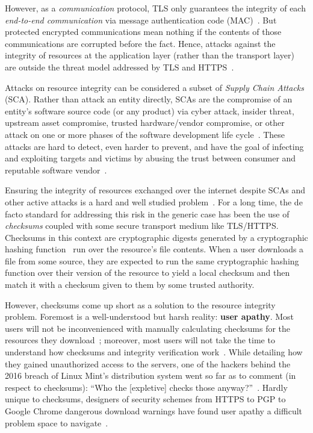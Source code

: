 However, as a \textit{communication} protocol, TLS only guarantees the integrity
of each \textit{end-to-end communication} via message authentication code
(MAC)~\cite{TLS1.2}. But protected encrypted communications mean nothing if the
contents of those communications are corrupted before the fact. Hence, attacks
against the integrity of resources at the application layer (rather than the
transport layer) are outside the threat model addressed by TLS and
HTTPS~\cite{TLS1.2, HTTPS}.

Attacks on resource integrity can be considered a subset of \emph{Supply Chain
Attacks} (SCA). Rather than attack an entity directly, SCAs are the compromise
of an entity's software source code (or any product) via cyber attack, insider
threat, upstream asset compromise, trusted hardware/vendor compromise, or other
attack on one or more phases of the software development life
cycle~\cite{NIST-SCA}. These attacks are hard to detect, even harder to prevent,
and have the goal of infecting and exploiting targets and victims by abusing the
trust between consumer and reputable software vendor~\cite{SCA}.

Ensuring the integrity of resources exchanged over the internet despite SCAs and
other active attacks is a hard and well studied problem~\cite{MD5Header,
HTTP1.1, HTTPS, SRI, LF, OpenPGP1, DNSSEC, PKI, Cherubini, Stickler}. For a long
time, the de facto standard for addressing this risk in the generic case has
been the use of \textit{checksums} coupled with some secure transport medium
like TLS/HTTPS. Checksums in this context are cryptographic digests generated by
a cryptographic hashing function~\cite{Rogaway} run over the resource's file
contents. When a user downloads a file from some source, they are expected to
run the same cryptographic hashing function over their version of the resource
to yield a local checksum and then match it with a checksum given to them by
some trusted authority.

However, checksums come up short as a solution to the resource integrity
problem. Foremost is a well-understood but harsh reality: \textbf{user apathy}.
Most users will not be inconvenienced with manually calculating checksums for
the resources they download~\cite{Cherubini, Fagan}; moreover, most users will
not take the time to understand how checksums and integrity verification
work~\cite{Cherubini, Tan, Hsiao}. While detailing how they gained unauthorized
access to the servers, one of the hackers behind the 2016 breach of Linux Mint's
distribution system went so far as to comment (in respect to checksums): ``Who
the [expletive] checks those anyway?''~\cite{SCA-MINT3}. Hardly unique to
checksums, designers of security schemes from HTTPS to PGP to Google Chrome
dangerous download warnings have found user apathy a difficult problem space to
navigate~\cite{PGPBad, Cherubini, Akhawe, ChromeClickThrough, Egelman1,
Egelman2, Modic, Reeder, Silic, Bianchi}.

